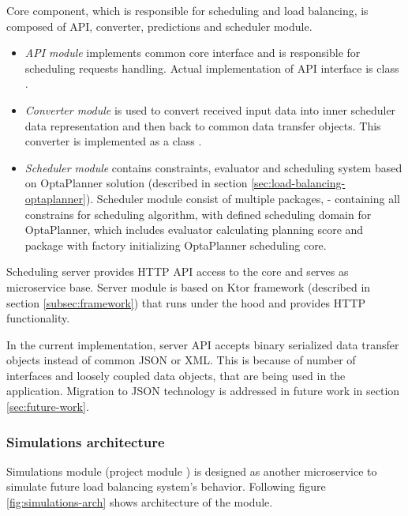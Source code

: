 Core component, 
which is responsible for scheduling and load balancing,
is composed of API, converter, predictions and scheduler module.
\begin{itemize}
    \item \textit{API module} implements common core interface  
    and is responsible for scheduling requests handling.
    Actual implementation of API interface is class .
    \item \textit{Converter module} is used to convert received input data into inner scheduler data representation 
    and then back to common data transfer objects. 
    This converter is implemented as a class .
    \item \textit{Scheduler module} contains constraints, evaluator and scheduling system based on OptaPlanner solution
    (described in section \ref{sec:load-balancing-optaplanner}).
    Scheduler module consist of multiple packages, 
     - containing all constrains for scheduling algorithm,
     with defined scheduling domain for OptaPlanner,
     which includes evaluator calculating planning score
    and  package with factory initializing OptaPlanner scheduling core.
\end{itemize}

Scheduling server provides HTTP API access to the core
and serves as microservice base.
Server module is based on Ktor framework (described in section \ref{subsec:framework})
that runs under the hood and provides HTTP functionality.

In the current implementation,
server API accepts binary serialized data transfer objects
instead of common JSON or XML.
This is because of number of interfaces and loosely coupled data objects,
that are being used in the application.
Migration to JSON technology is addressed in future work in section \ref{sec:future-work}.

\subsubsection{Simulations architecture}\label{subsec:simulations-architecture}
Simulations module (project module ) is designed as another microservice to simulate future load balancing system's behavior.
Following figure \ref{fig:simulations-arch} shows architecture of the module.  

